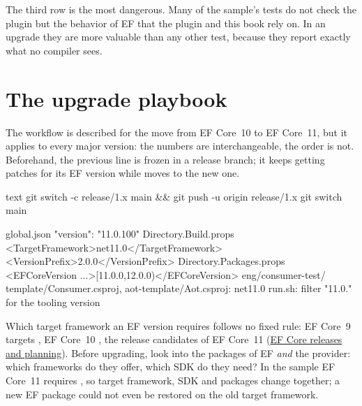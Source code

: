 The third row is the most dangerous. Many of the sample's tests do not check the plugin but
the behavior of EF that the plugin and this book rely on. In an upgrade they are more
valuable than any other test, because they report exactly what no compiler sees.

\section{The upgrade playbook}

The workflow is described for the move from EF Core~10 to EF Core~11, but it applies to every
major version: the numbers are interchangeable, the order is not. Beforehand, the previous
line is frozen in a release branch; it keeps getting patches for its EF version while
 moves to the new one.

\begin{sourcecode}{text}
git switch -c release/1.x main && git push -u origin release/1.x
git switch main

global.json               "version": "11.0.100"
Directory.Build.props     <TargetFramework>net11.0</TargetFramework>
                          <VersionPrefix>2.0.0</VersionPrefix>
Directory.Packages.props  <EFCoreVersion ...>[11.0.0,12.0.0)</EFCoreVersion>
eng/consumer-test/        template/Consumer.csproj, aot-template/Aot.csproj: net11.0
                          run.sh: filter "11.0." for the tooling version
\end{sourcecode}

Which target framework an EF version requires follows no fixed rule: EF Core~9 targets
, EF Core~10 , the release
candidates of EF Core~11 
(\href{https://learn.microsoft.com/en-us/ef/core/what-is-new/}{EF Core releases and planning}). Before upgrading, look into the packages of
EF \emph{and} the provider: which frameworks do they offer, which SDK do they need? In the
sample EF Core~11 requires , so target framework, SDK and
packages change together; a new EF package could not even be restored on the old target
framework.

